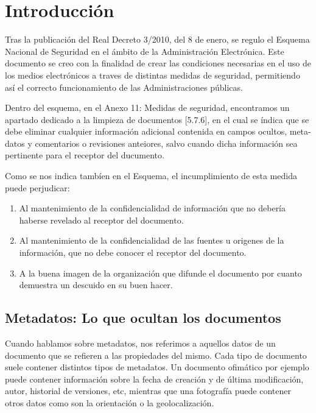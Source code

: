 \chapter{Introducción}


Tras la publicación del Real Decreto 3/2010, del 8 de enero, se regulo el Esquema Nacional de Seguridad en el ámbito 
de la Administración Electrónica. Este documento se creo con la finalidad de crear las condiciones necesarias en el
uso de los medios electrónicos a traves de distintas medidas de seguridad, permitiendo así el correcto funcionamiento de
las Administraciones públicas.


Dentro del esquema, en el Anexo 11: Medidas de seguridad, encontramos un apartado dedicado a la limpieza de documentos
[5.7.6], en el cual se índica que se debe eliminar cualquier información adicional contenida en campos ocultos, 
meta-datos y comentarios o revisiones anteiores, salvo cuando dicha información sea pertinente para el receptor del 
ducumento.

Como se nos indica tambíen en el Esquema, el incumplimiento de esta medida puede perjudicar:


\begin{enumerate}

	\item Al mantenimiento de la confidencialidad de información que no debería haberse revelado al receptor del
	documento.
	\item Al mantenimiento de la confidencialidad de las fuentes u origenes de la información, que no debe 
	conocer el receptor del documento.
	\item A la buena imagen de la organización que difunde el documento por cuanto demuestra un descuido en su buen
	hacer.
\end{enumerate}



\section{Metadatos: Lo que ocultan los documentos}

Cuando hablamos sobre metadatos, nos referimos a aquellos datos de un documento que se refieren a las propiedades del 
mismo. Cada tipo de documento suele contener distintos tipos de metadatos. Un documento ofimático por ejemplo puede 
contener información sobre la fecha de creación y de última modificación, autor, historial de versiones, etc, mientras 
que una fotografía puede contener otros datos como son la orientación o la geolocalización.


